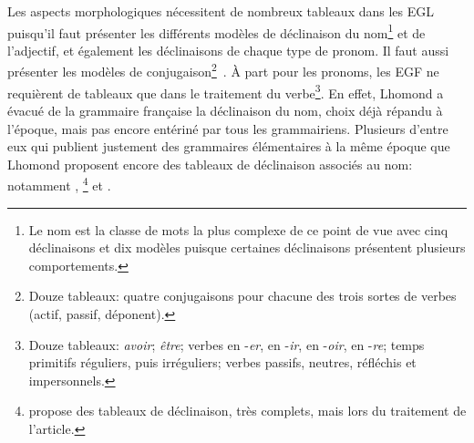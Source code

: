 \documentclass[output=paper]{langsci/langscibook}
\begin{document}
Les aspects morphologiques nécessitent de nombreux tableaux dans les EGL puisqu’il faut présenter les différents modèles de déclinaison du nom\footnote{ \textrm{Le nom est la classe de mots la plus complexe de ce point de vue avec cinq déclinaisons et dix modèles puisque certaines déclinaisons présentent plusieurs comportements.}} et de l’adjectif, et également les déclinaisons de chaque type de pronom. Il faut aussi présenter les modèles de conjugaison\footnote{ \textrm{Douze tableaux: quatre conjugaisons pour chacune des trois sortes de verbes (actif, passif, déponent).}}~. À part pour les pronoms, les EGF ne requièrent de tableaux que dans le traitement du verbe\footnote{ \textrm{Douze tableaux:} \textrm{\textit{avoir}}\textrm{;} \textrm{\textit{être}}\textrm{; verbes en -}\textrm{\textit{er}}\textrm{, en -}\textrm{\textit{ir}}\textrm{, en -}\textrm{\textit{oir}}\textrm{, en -}\textrm{\textit{re}}\textrm{; temps primitifs réguliers, puis irréguliers; verbes passifs, neutres, réfléchis et impersonnels.}}. En effet, Lhomond a évacué de la grammaire française la déclinaison du nom, choix déjà répandu à l’époque, mais pas encore entériné par tous les grammairiens. Plusieurs d’entre eux qui publient justement des grammaires élémentaires à la même époque que Lhomond proposent encore des tableaux de déclinaison associés au nom: notamment \citet{viard_les_1763} \citet{bertera_nouvelle_1773}, \citet{royon_professeur_traite_1777}\footnote{ \textrm{\citet{royon_professeur_traite_1777} propose des tableaux de déclinaison, très complets, mais lors du traitement de l’article.}} et \citet{chompre_petite_1778}.
\end{document}
